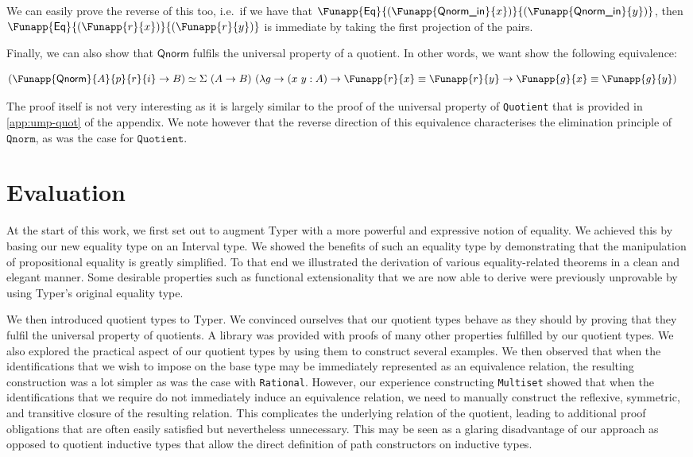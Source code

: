 \documentclass[12pt,twoside,maitrise]{dms}
\theoremstyle{definition}
\numberwithin{equation}{section}
\numberwithin{table}{chapter}
\numberwithin{figure}{chapter}
\newcommand\kw[1] {\textsf{#1}}
\newcommand\id[1] {\texttt{#1}}
\begin{document}
We can easily prove the reverse of this too, i.e.\ if we have that
$\Funapp{\kw{Eq}}{(\Funapp{\kw{Qnorm\_in}}{x})}{(\Funapp{\kw{Qnorm\_in}}{y})}$,
then $\Funapp{\kw{Eq}}{(\Funapp{r}{x})}{(\Funapp{r}{y})}$ is immediate by taking
the first projection of the pairs.

Finally, we can also show that $\kw{Qnorm}$ fulfils the universal property of a
quotient. In other words, we want show the following equivalence:

\begin{align*}
  & (\Funapp{\kw{Qnorm}}{A}{p}{r}{i} \rightarrow B) \simeq \Sigma \ (A
  \rightarrow B) \ (\lambda g \rightarrow (x \ y : A) \rightarrow \Funapp{r}{x}
  \equiv \Funapp{r}{y} \rightarrow \Funapp{g}{x} \equiv \Funapp{g}{y})
\end{align*}

The proof itself is not very interesting as it is largely similar to the proof
of the universal property of \id{Quotient} that is provided in
\autoref{app:ump-quot} of the appendix. We note however that the reverse
direction of this equivalence characterises the elimination principle of
$\id{Qnorm}$, as was the case for $\id{Quotient}$.

\chapter{Evaluation}

At the start of this work, we first set out to augment Typer with a more
powerful and expressive notion of equality. We achieved this by basing our new
equality type on an Interval type. We showed the benefits of such an equality
type by demonstrating that the manipulation of propositional equality is greatly
simplified. To that end we illustrated the derivation of various
equality-related theorems in a clean and elegant manner. Some desirable
properties such as functional extensionality that we are now able to derive were
previously unprovable by using Typer's original equality type.

We then introduced quotient types to Typer. We convinced ourselves that our
quotient types behave as they should by proving that they fulfil the universal
property of quotients. A library was provided with proofs of many other
properties fulfilled by our quotient types. We also explored the practical
aspect of our quotient types by using them to construct several examples. We
then observed that when the identifications that we wish to impose on the base
type may be immediately represented as an equivalence relation, the resulting
construction was a lot simpler as was the case with \id{Rational}. However, our
experience constructing \id{Multiset} showed that when the identifications that
we require do not immediately induce an equivalence relation, we need to
manually construct the reflexive, symmetric, and transitive closure of the
resulting relation. This complicates the underlying relation of the quotient,
leading to additional proof obligations that are often easily satisfied but
nevertheless unnecessary. This may be seen as a glaring disadvantage of our
approach as opposed to quotient inductive types that allow the direct definition
of path constructors on inductive types.
\end{document}
